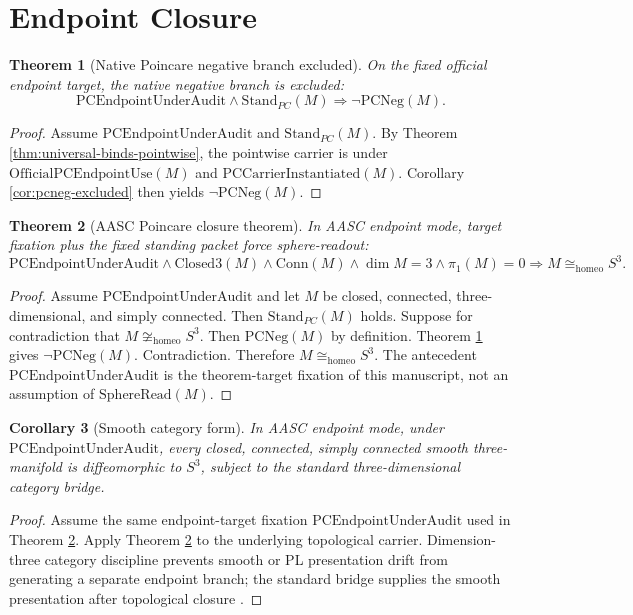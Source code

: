 \documentclass[11pt]{article}
\newtheorem{theorem}{Theorem}[section]
\newtheorem{corollary}[theorem]{Corollary}
\newcommand{\Sthree}{S^{3}}
\newcommand{\ClosedThree}{\mathrm{Closed3}}
\newcommand{\Conn}{\mathrm{Conn}}
\newcommand{\StandPC}{\mathrm{Stand}_{PC}}
\newcommand{\SphereRead}{\mathrm{SphereRead}}
\newcommand{\PCEndpoint}{\mathrm{PCEndpointUnderAudit}}
\newcommand{\OfficialPCEndpointUse}{\mathrm{OfficialPCEndpointUse}}
\newcommand{\PCCarrierInst}{\mathrm{PCCarrierInstantiated}}
\newcommand{\PCNeg}{\mathrm{PCNeg}}
\newcommand{\Homeo}{\cong_{\mathrm{homeo}}}
\begin{document}
\section{Endpoint Closure}\label{sec:main}


\begin{theorem}[Native Poincare negative branch excluded]\label{thm:native-negative-excluded}
On the fixed official endpoint target, the native negative branch is excluded:
\[
\PCEndpoint\wedge\StandPC(M)\Rightarrow \neg\PCNeg(M).
\]
\end{theorem}
\begin{proof}
Assume \(\PCEndpoint\) and \(\StandPC(M)\). By Theorem \ref{thm:universal-binds-pointwise}, the pointwise carrier is under \(\OfficialPCEndpointUse(M)\) and \(\PCCarrierInst(M)\). Corollary \ref{cor:pcneg-excluded} then yields \(\neg\PCNeg(M)\).
\end{proof}

\begin{theorem}[AASC Poincare closure theorem]\label{thm:aasc-poincare}
In AASC endpoint mode, target fixation plus the fixed standing packet force sphere-readout:
\[
\PCEndpoint\wedge\ClosedThree(M)\wedge\Conn(M)\wedge\dim M=3\wedge\pi_1(M)=0\Rightarrow M\Homeo\Sthree.
\]
\end{theorem}
\begin{proof}
Assume \(\PCEndpoint\) and let \(M\) be closed, connected, three-dimensional, and simply connected. Then \(\StandPC(M)\) holds. Suppose for contradiction that \(M\not\Homeo\Sthree\). Then \(\PCNeg(M)\) by definition. Theorem \ref{thm:native-negative-excluded} gives \(\neg\PCNeg(M)\). Contradiction. Therefore \(M\Homeo\Sthree\). The antecedent \(\PCEndpoint\) is the theorem-target fixation of this manuscript, not an assumption of \(\SphereRead(M)\).
\end{proof}

\begin{corollary}[Smooth category form]
\leavevmode\par
In AASC endpoint mode, under \(\PCEndpoint\), every closed, connected, simply connected smooth three-manifold is diffeomorphic to \(\Sthree\), subject to the standard three-dimensional category bridge.
\end{corollary}
\begin{proof}
Assume the same endpoint-target fixation \(\PCEndpoint\) used in Theorem \ref{thm:aasc-poincare}. Apply Theorem \ref{thm:aasc-poincare} to the underlying topological carrier. Dimension-three category discipline prevents smooth or PL presentation drift from generating a separate endpoint branch; the standard bridge supplies the smooth presentation after topological closure \cite{Moise1977}.
\end{proof}
\end{document}
